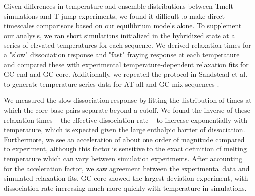 \documentclass[journal=jpcbfk,manuscript=article]{achemso}
\begin{document}
Given differences in temperature and ensemble distributions between Tmelt simulations and T-jump experiments, we found it difficult to make direct timescales comparisons based on our equilibrium models alone. To supplement our analysis, we ran short simulations initialized in the hybridized state at a series of elevated temperatures for each sequence. We derived relaxation times for a "slow" dissociation response and "fast" fraying response at each temperature and compared these with experimental temperature-dependent relaxation fits for GC-end and GC-core. Additionally, we repeated the protocol in Sandstead et al. to generate temperature series data for AT-all and GC-mix sequences \citep{Sanstead2018DirectDehybridization}. 

We measured the slow dissociation response by fitting the distribution of times at which the core base pairs separate beyond a cutoff. We found the inverse of these relaxation times -- the effective dissociation rate -- to increase exponentially with temperature, which is expected given the large enthalpic barrier of dissociation. Furthermore, we see an acceleration of about one order of magnitude compared to experiment, although this factor is sensitive to the exact definition of melting temperature which can vary between simulation experiments. After accounting for the acceleration factor, we saw agreement between the experimental data and simulated relaxation fits. GC-core showed the largest deviation experiment, with dissociation rate increasing much more quickly with temperature in simulations.

\end{document}
